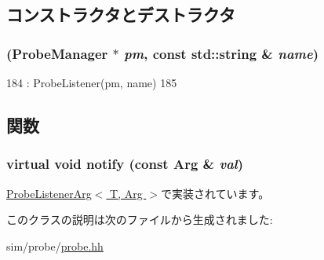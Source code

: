 \subsection{コンストラクタとデストラクタ}
\hypertarget{classProbeListenerArgBase_acd3780c8a8392c3fe3d71ac5aa7d34a0}{
\subsubsection[{ProbeListenerArgBase}]{ ({\bf ProbeManager} $\ast$ {\em pm}, \/  const std::string \& {\em name})}}
\label{classProbeListenerArgBase_acd3780c8a8392c3fe3d71ac5aa7d34a0}



\begin{DoxyCode}
184         : ProbeListener(pm, name)
185     {}
\end{DoxyCode}


\subsection{関数}
\hypertarget{classProbeListenerArgBase_ab47404eccdea3a95766588b12953baf5}{
\subsubsection[{notify}]{\setlength{\rightskip}{0pt plus 5cm}virtual void notify (const Arg \& {\em val})}}
\label{classProbeListenerArgBase_ab47404eccdea3a95766588b12953baf5}


\hyperlink{classProbeListenerArg_a03fbf8d00c9fe34c7f9ec78f46c3f621}{ProbeListenerArg$<$ T, Arg $>$}で実装されています。

このクラスの説明は次のファイルから生成されました:\begin{DoxyCompactItemize}
\item 
sim/probe/\hyperlink{probe_8hh}{probe.hh}\end{DoxyCompactItemize}
